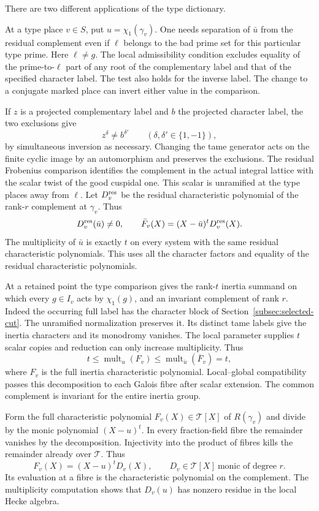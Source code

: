 There are two different applications of the type dictionary.

At a type place \(v\in S\), put \(u=\chi_1(\gamma_v)\).
One needs separation of \(\bar u\) from the residual complement
even if \(\ell\) belongs to the bad prime set for this particular
type prime. Here \(\ell\ne g\). The local admissibility condition excludes equality of the prime-to-\(\ell\) part of any root of the complementary label and that of the specified character label. The test also holds for the inverse label. The
change to a conjugate marked place can invert either value in
the comparison.

If \(z\) is a projected complementary label and \(b\) the projected character label, the two exclusions give
\[
 z^\delta\ne b^{\delta'}\qquad(\delta,\delta'\in\{1,-1\}),
\]
by simultaneous inversion as necessary. Changing the tame generator
acts on the finite cyclic image by an automorphism and preserves
the exclusions. The residual Frobenius comparison identifies the
complement in the actual integral lattice with the scalar twist
of the good cuspidal one. This scalar is unramified at the type
places away from \(\ell\). Let \(D^{\rm res}_v\) be the residual characteristic
polynomial of the rank-\(r\) complement at \(\gamma_v\).
Thus
\[
      D_v^{\rm res}(\bar u)\ne0,\qquad
      \bar F_v(X)=(X-\bar u)^tD_v^{\rm res}(X).
\]
The multiplicity of \(\bar u\) is exactly \(t\) on every
system with the same residual characteristic polynomials.
This uses all the character factors and equality of the residual
characteristic polynomials.

At a retained point the type comparison gives the rank-\(t\)
inertia summand on which every \(g\in I_v\) acts by
\(\chi_1(g)\), and an invariant complement of rank \(r\).
Indeed the occurring full label has the character block of
Section~\ref{subsec:selected-cut}. The unramified normalization
preserves it. Its distinct tame labels give the inertia
characters and its monodromy vanishes. The local parameter supplies \(t\) scalar copies and reduction can only increase multiplicity. Thus
\[
 t\le\operatorname{mult}_{u}(F_v)\le\operatorname{mult}_{\bar u}(\overline F_v)=t,
\]
where \(F_v\) is the full inertia characteristic polynomial. Local--global
compatibility passes this decomposition to each Galois fibre
after scalar extension. The common complement is invariant for
the entire inertia group.

Form the full characteristic polynomial \(F_v(X)\in\mathcal T[X]\)
of \(R(\gamma_v)\) and divide by the monic polynomial
\((X-u)^t\). In every fraction-field fibre the remainder
vanishes by the decomposition. Injectivity into the product of fibres kills the remainder already over \(\mathcal T\). Thus
\[
 F_v(X)=(X-u)^t D_v(X),\qquad D_v\in\mathcal T[X]\ \text{monic of degree }r.
\]
Its evaluation
at a fibre is the characteristic polynomial on the complement.
The multiplicity computation shows that \(D_v(u)\) has nonzero
residue in the local Hecke algebra.


